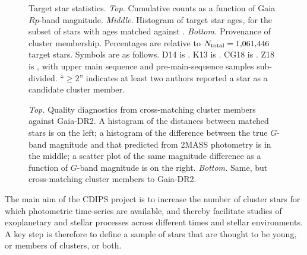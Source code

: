 \documentclass[12pt,twocolumn,tighten]{aastex62}
\begin{document}
\begin{figure}[!t]
	\begin{center}
		\leavevmode
		\vspace{-0.8cm}
		\vspace{-0.8cm}
	\end{center}
	\vspace{-0.8cm}
	\caption{
		Target star statistics.
		{\it Top.} Cumulative counts as a function of Gaia $Rp$-band
		magnitude.  
		{\it Middle.} Histogram of target star ages, for the subset of
		stars with ages matched against \citet{Kharchenko_et_al_2013}.
		{\it Bottom.} Provenance of cluster membership.  Percentages are
		relative to $N_{\rm total}=1{,}061{,}446$ target stars. Symbols
		are as follows.
		D14 is \citet{dias_proper_2014}.
		K13 is \citet{Kharchenko_et_al_2013}.
		CG18 is \citet{cantat-gaudin_gaia_2018}.
		Z18 is \citet{zari_3d_2018}, with upper main sequence and
		pre-main-sequence samples sub-divided.
		``$\geq 2$'' indicates at least two authors reported a star as a
		candidate cluster member.
		\label{fig:cdips_targets}
	}
\end{figure}

\begin{figure}[!t]
	\vspace{-1.1cm}
	\vspace{-0.8cm}
	\caption{
    {\it Top.} Quality diagnostics from cross-matching
    \cite{Kharchenko_et_al_2013} cluster members against Gaia-DR2.  A
    histogram of the distances between matched stars is on the left; a
    histogram of the difference between the true $G$-band magnitude
    and that predicted from 2MASS photometry is in the middle; a
    scatter plot of the same magnitude difference as a function of
    $G$-band magnitude is on the right.
		{\it Bottom.} Same, but cross-matching \cite{dias_proper_2014}
		cluster members to Gaia-DR2.
	}
	\label{fig:xmatch_info}
\end{figure}

The main aim of the CDIPS project is to increase the number of cluster
stars for which photometric time-series are available, and thereby
facilitate studies of exoplanetary and stellar processes across
different times and stellar environments.  A key step is therefore to
define a sample of stars that are thought to be young, or members of
clusters, or both.
\end{document}
